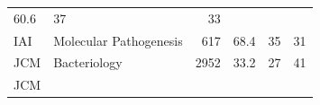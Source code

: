 \documentclass[11pt,]{article}
\begin{document}
\begin{longtable}[]{@{}llrrrr@{}}
\begin{minipage}[t]{0.08\columnwidth}
60.6\strut
\end{minipage} & \begin{minipage}[t]{0.11\columnwidth}\raggedleft\strut
37\strut
\end{minipage} & \begin{minipage}[t]{0.11\columnwidth}\raggedleft\strut
33\strut
\end{minipage}\tabularnewline
\begin{minipage}[t]{0.06\columnwidth}\raggedright\strut
IAI\strut
\end{minipage} & \begin{minipage}[t]{0.43\columnwidth}\raggedright\strut
Molecular Pathogenesis\strut
\end{minipage} & \begin{minipage}[t]{0.04\columnwidth}\raggedleft\strut
617\strut
\end{minipage} & \begin{minipage}[t]{0.08\columnwidth}\raggedleft\strut
68.4\strut
\end{minipage} & \begin{minipage}[t]{0.11\columnwidth}\raggedleft\strut
35\strut
\end{minipage} & \begin{minipage}[t]{0.11\columnwidth}\raggedleft\strut
31\strut
\end{minipage}\tabularnewline
\begin{minipage}[t]{0.06\columnwidth}\raggedright\strut
JCM\strut
\end{minipage} & \begin{minipage}[t]{0.43\columnwidth}\raggedright\strut
Bacteriology\strut
\end{minipage} & \begin{minipage}[t]{0.04\columnwidth}\raggedleft\strut
2952\strut
\end{minipage} & \begin{minipage}[t]{0.08\columnwidth}\raggedleft\strut
33.2\strut
\end{minipage} & \begin{minipage}[t]{0.11\columnwidth}\raggedleft\strut
27\strut
\end{minipage} & \begin{minipage}[t]{0.11\columnwidth}\raggedleft\strut
41\strut
\end{minipage}\tabularnewline
\begin{minipage}[t]{0.06\columnwidth}\raggedright\strut
JCM\strut
\end{minipage} & \begin{minipage}[t]{0.43\columnwidth}\raggedright\strut

\end{minipage}
\end{longtable}
\end{document}
